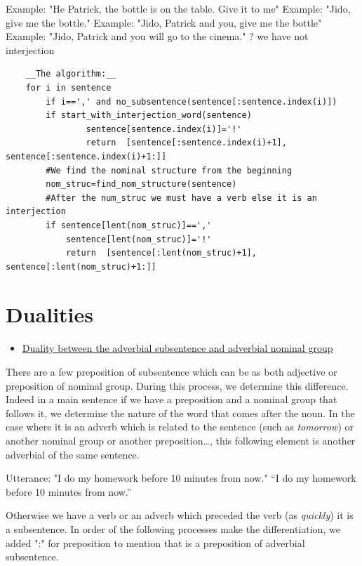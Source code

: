 \documentclass[twoside,a4paper,10pt]{report}
\newcommand{\dokutitleleveltree}[1]{\section{#1}}
\newcommand{\dokuitalic}[1]{\textsl{#1}}
\newcommand{\dokuunderline}[1]{\underline{#1}}
\newcommand{\dokuitem}{\item}
\begin{document}
\small
\begin{verbatimtab}
  Example: "He Patrick, the bottle is on the table. Give it to me"
  Example: "Jido, give me the bottle." 
  Example: "Jido, Patrick and you, give me the bottle"
  Example: "Jido, Patrick and you will go to the cinema." ? we have not interjection
\end{verbatimtab}
\normalsize

\lstset{language=python}
\begin{lstlisting}
    __The algorithm:__
    for i in sentence
        if i==',' and no_subsentence(sentence[:sentence.index(i)])
	    if start_with_interjection_word(sentence)
                sentence[sentence.index(i)]='!'
                return  [sentence[:sentence.index(i)+1], sentence[:sentence.index(i)+1:]]
        #We find the nominal structure from the beginning
        nom_struc=find_nom_structure(sentence)
        #After the num_struc we must have a verb else it is an interjection
        if sentence[lent(nom_struc)]==','
            sentence[lent(nom_struc)]='!'
            return  [sentence[:lent(nom_struc)+1], sentence[:lent(nom_struc)+1:]]

\end{lstlisting}

\dokutitleleveltree{Dualities}
\label{ceb3780718f195cca0227bdf527d4a06}%

\begin{itemize}
\dokuitem  \dokuunderline{Duality between the adverbial subsentence and adverbial nominal group}
\end{itemize}
There are a few preposition of subsentence which can be as both adjective or preposition of nominal group. During this process, we determine this difference. Indeed in a main sentence if we have a preposition and a nominal group that follows it, we determine the nature of the word that comes after the noun. In the case where it is an adverb which is related to the sentence (such as \dokuitalic{tomorrow}) or another nominal group or another preposition…, this following element is another adverbial of the same sentence. 


\small
\begin{verbatimtab}
  Utterance: "I do my homework before 10 minutes from now."
  “I do my homework before 10 minutes from now.”
\end{verbatimtab}
\normalsize
Otherwise we have a verb or an adverb which preceded the verb (as \dokuitalic{quickly}) it is a subsentence. In order of the following processes make the differentiation, we added ":" for preposition to mention that is a preposition of adverbial subsentence.
\end{document}
